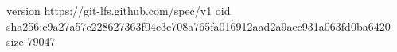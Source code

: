 version https://git-lfs.github.com/spec/v1
oid sha256:c9a27a57e228627363f04e3c708a765fa016912aad2a9aec931a063fd0ba6420
size 79047
